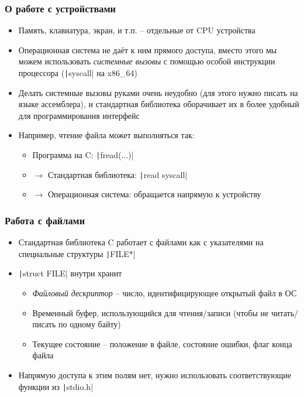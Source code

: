 \documentclass[10pt]{beamer}
\begin{document}
\begin{frame}[fragile]
\frametitle{О работе с устройствами}
\begin{itemize}
\item Память, клавиатура, экран, и т.п. -- отдельные от CPU устройства
\pause
\item Операционная система не даёт к ним прямого доступа, вместо этого мы можем использовать \textit{системные вызовы} с помощью особой инструкции процессора (\texttt|syscall| на x86\_64)
\pause
\item Делать системные вызовы руками очень неудобно (для этого нужно писать на языке ассемблера), и стандартная библиотека оборачивает их в более удобный для программирования интерфейс
\pause
\item Например, чтение файла может выполняться так:
\pause
\begin{itemize}
\item Программа на C: \texttt|fread(...)|
\pause
\item \(\rightarrow\) Стандартная библиотека: \texttt|read syscall|
\pause
\item \(\rightarrow\) Операционная система: обращается напрямую к устройству
\end{itemize}
\end{itemize}
\end{frame}

\begin{frame}[fragile]
\frametitle{Работа с файлами}
\begin{itemize}
\item Стандартная библиотека C работает с файлами как с указателями на специальные структуры \texttt|FILE*|
\pause
\item \texttt|struct FILE| внутри хранит
\pause
\begin{itemize}
\item \textit{Файловый дескриптор} -- число, идентифицирующее открытый файл в ОС
\pause
\item Временный буфер, использующийся для чтения/записи (чтобы не читать/писать по одному байту)
\pause
\item Текущее состояние -- положение в файле, состояние ошибки, флаг конца файла
\end{itemize}
\pause
\item Напрямую доступа к этим полям нет, нужно использовать соответствующие функции из \texttt|stdio.h|
\end{itemize}
\end{frame}
\end{document}
